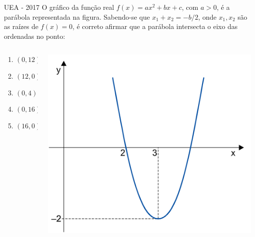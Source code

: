 \documentclass[11pt]{beamer}
\newif\ifgab
\newcommand{\gab}[1]{%
  \ifgab
    \textcolor{red!80!black}{\textbf{#1}}%
  \else
    #1%
  \fi
}
\begin{document}
\begin{frame}{UEA - 2017}
    O gráfico da função real $f(x)=ax^{2}+ bx + c$, com $a > 0$, é a parábola representada na figura. Sabendo-se que $x_{1}+x_{2}= -{b}/2$, onde $ x_{1}, x_ {2}$ são as raízes de $f(x) = 0$, é correto afirmar que a parábola intersecta o eixo das ordenadas no ponto:

    \begin{columns}
        \begin{column}{0.4\textwidth}
            \begin{enumerate}[a]
                \item $(0,12)$ 
                \item $(12,0)$
                \item $(0,4)$ 
                \item \gab{$(0,16)$} %
                \item $(16,0)$
            \end{enumerate}
        \end{column}

        \begin{column}{0.5\textwidth}
            \centering
            \includegraphics[width=0.8\linewidth]{imagens/uea-macro-2017(2).png}
        \end{column}
    \end{columns}
    
\end{frame}
\end{document}
